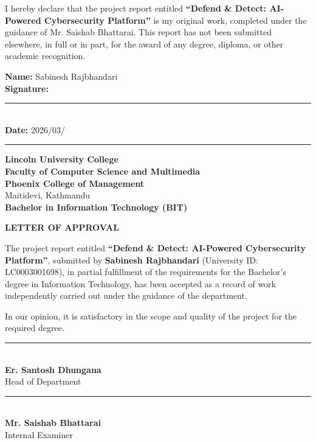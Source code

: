 \documentclass[12pt,a4paper]{report}
\begin{document}
I hereby declare that the project report entitled \textbf{``Defend \& Detect: AI-Powered Cybersecurity Platform''} is my original work, completed under the guidance of Mr. Saishab Bhattarai. This report has not been submitted elsewhere, in full or in part, for the award of any degree, diploma, or other academic recognition.

\vspace{0.8cm}

\noindent
\textbf{Name:} Sabinesh Rajbhandari \\
\textbf{Signature:} \rule{5cm}{0.4pt} \\
\textbf{Date:} 2026/03/ \rule{2cm}{0.4pt}

\vspace{1.5cm}

\newpage
\begin{center}
    \textbf{\Large Lincoln University College}\\
    \textbf{\large Faculty of Computer Science and Multimedia}\\
    \textbf{Phoenix College of Management}\\
    Maitidevi, Kathmandu\\
    \textbf{Bachelor in Information Technology (BIT)}
\end{center}

\vspace{0.5cm}

\begin{center}
    \textbf{\LARGE LETTER OF APPROVAL}
\end{center}

The project report entitled \textbf{``Defend \& Detect: AI-Powered Cybersecurity Platform''}, submitted by \textbf{Sabinesh Rajbhandari} (University ID: LC0003001698), in partial fulfillment of the requirements for the Bachelor’s degree in Information Technology, has been accepted as a record of work independently carried out under the guidance of the department.

\vspace{0.5cm}
In our opinion, it is satisfactory in the scope and quality of the project for the required degree.

\vspace{2cm}

\noindent
\begin{minipage}{0.45\textwidth}
    \rule{6cm}{0.4pt}\\
    \textbf{Er. Santosh Dhungana}\\
    Head of Department
\end{minipage}
\hfill
\begin{minipage}{0.45\textwidth}
    \rule{6cm}{0.4pt}\\
    \textbf{Mr. Saishab Bhattarai}\\
    Internal Examiner
\end{minipage}
\end{document}
